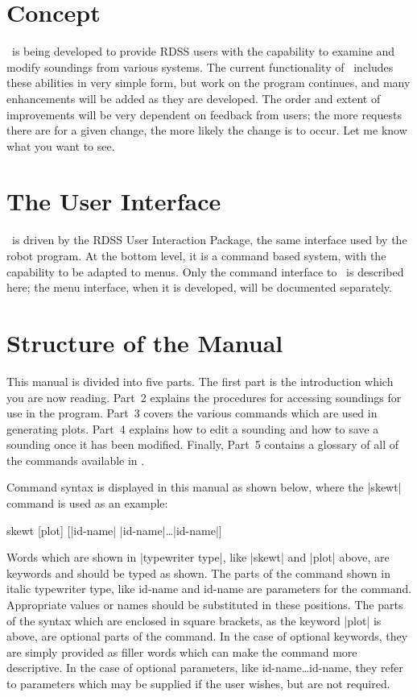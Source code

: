\section {Concept}
\Suds\ is being developed to provide RDSS users with the capability to examine
and modify soundings from various systems.  The current functionality of
\suds\ includes these abilities in very simple form, but work on the
program continues, and many enhancements will be added as they are developed.
The order and extent of improvements will be very dependent on feedback from
users; the more requests there are for a given change, the more likely the 
change is to occur.  Let me know what you want to see.

\section {The User Interface}
\Suds\ is driven by the RDSS User Interaction Package, the same interface used
by the {\caps robot} program.  At the bottom level, it is a command based 
system, with the capability to be adapted to menus.  Only the command interface
to \suds\ is described here; the menu interface, when it is developed, will be
documented separately.

\section {Structure of the Manual}
This manual is divided into five parts.  The first part is the introduction
which you are now reading.  Part~2 explains the procedures for accessing
soundings for use in the program.  Part~3 covers the various commands which
are used in generating plots.  Part~4 explains how to edit a sounding and 
how to save a sounding once it has been modified.  Finally, Part~5 contains a
glossary of all of the commands available in \suds.

Command syntax is displayed in this manual as shown below, where the |skewt|
command is used as an example:
\begin{example}
	skewt [plot] [|id-name| |id-name|\ldots |id-name|]
\end{example}
Words which are shown in |typewriter type|, like |skewt| and |plot| above,
are keywords and should be typed
as shown.  The parts of the command shown in {\pf italic typewriter type},
like {\pf id-name} and {\pf id-name} are
parameters for the command.  Appropriate values or names should be 
substituted in these positions.   The parts of the syntax which are enclosed
in square brackets, as the keyword |plot| is above, are optional parts of
the command.  In the case of optional keywords, they are simply provided as 
filler words which can make the command more descriptive.  In the case of 
optional parameters, like {\pf id-name}\ldots {\pf id-name}, 
they refer to parameters which may be supplied if the user wishes, but 
are not required.

